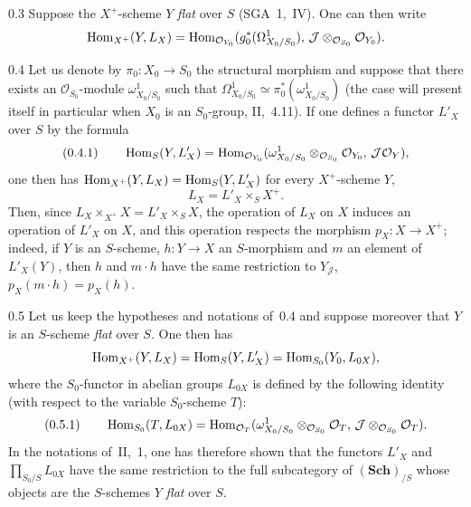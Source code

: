 \begin{remark}{0.3}
\label{III.0.3}
Suppose the \(X^{+}\)-scheme \(Y\) \emph{flat} over \(S\) (\cf SGA~1,~IV).
One can then write
\[
\operatorname{Hom}_{X^{+}}(Y,L_{X})
=\operatorname{Hom}_{\mathcal{O}_{Y_{0}}}(g_{0}^{*}(\Omega^{1}_{X_{0}/S_{0}}),\,
\mathcal{J}\otimes_{\mathcal{O}_{S_{0}}}\mathcal{O}_{Y_{0}}).
\]
\end{remark}

\begin{remark}{0.4}
\label{III.0.4}
Let us denote by \(\pi_{0}\colon X_{0}\to S_{0}\) the structural morphism
and suppose that there exists an \(\mathcal{O}_{S_{0}}\)-module
\(\omega^{1}_{X_{0}/S_{0}}\) such that
\(\Omega^{1}_{X_{0}/S_{0}}\simeq\pi_{0}^{*}(\omega^{1}_{X_{0}/S_{0}})\)
(the case will present itself in particular when \(X_{0}\) is an
\(S_{0}\)-group, \cf II,~4.11). If one defines a functor \(L'_{X}\)
over \(S\) by the formula
\[
(0.4.1)\qquad
\operatorname{Hom}_{S}(Y,L'_{X})
=\operatorname{Hom}_{\mathcal{O}_{Y_{0}}}(\omega^{1}_{X_{0}/S_{0}}\otimes_{\mathcal{O}_{S_{0}}}\mathcal{O}_{Y_{0}},\,
\mathcal{J}\mathcal{O}_{Y}),
\]
one then has \(\operatorname{Hom}_{X^{+}}(Y,L_{X})=\operatorname{Hom}_{S}(Y,L'_{X})\)
for every \(X^{+}\)-scheme \(Y\), \ie
\[
L_{X}=L'_{X}\times_{S}X^{+}.
\]
{\renewcommand{\thefootnote}{(21)}}%
Then, since \(L_{X}\times_{X^{+}}X=L'_{X}\times_{S}X\),
the operation of \(L_{X}\) on \(X\) induces an operation of
\(L'_{X}\) on \(X\), and this operation respects the morphism
\(p_{X}\colon X\to X^{+}\); indeed, if \(Y\) is an \(S\)-scheme,
\(h\colon Y\to X\) an \(S\)-morphism and \(m\) an element of
\(L'_{X}(Y)\), then \(h\) and \(m\cdot h\) have the same restriction
to \(Y_{\mathcal{J}}\), \ie \(p_{X}(m\cdot h)=p_{X}(h)\).
\end{remark}

\begin{remark}{0.5}
\label{III.0.5}
Let us keep the hypotheses and notations of~0.4 and suppose moreover that
\(Y\) is an \(S\)-scheme \emph{flat} over \(S\). One then has
\[
\operatorname{Hom}_{X^{+}}(Y,L_{X})
=\operatorname{Hom}_{S}(Y,L'_{X})
=\operatorname{Hom}_{S_{0}}(Y_{0},L_{0X}),
\]
where the \(S_{0}\)-functor in abelian groups \(L_{0X}\) is defined
by the following identity (with respect to the variable \(S_{0}\)-scheme
\(T\)):
\[
(0.5.1)\qquad
\operatorname{Hom}_{S_{0}}(T,L_{0X})
=\operatorname{Hom}_{\mathcal{O}_{T}}(\omega^{1}_{X_{0}/S_{0}}\otimes_{\mathcal{O}_{S_{0}}}\mathcal{O}_{T},\,
\mathcal{J}\otimes_{\mathcal{O}_{S_{0}}}\mathcal{O}_{T}).
\]
In the notations of~II,~1, one has therefore shown that the functors
\(L'_{X}\) and \(\prod_{S_{0}/S}L_{0X}\) have the same
restriction to the full subcategory of \((\mathbf{Sch})_{/S}\) whose objects
are the \(S\)-schemes \(Y\) \emph{flat} over \(S\).
\end{remark}

